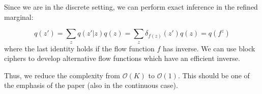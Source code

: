 Since we are in the discrete setting, we can perform exact inference in the refined marginal:

$$
q(z') = \sum_{z} q(z'|z)q(z) = \sum_{z} \delta_{f(z)}(z') q(z) = q(f^{z})
$$
where the last identity holds if the flow function $f$ has inverse. We can use block ciphers to develop alternative flow functions which have an efficient inverse.

Thus, we reduce the complexity from $\mathcal{O}(K)$ to $\mathcal{O}(1)$. This should be one of the emphasis of the paper (also in the continuous case).




\fi


\iffalse
